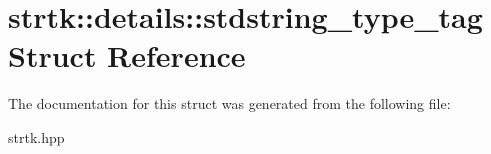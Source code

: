 \hypertarget{structstrtk_1_1details_1_1stdstring__type__tag}{\section{strtk\-:\-:details\-:\-:stdstring\-\_\-type\-\_\-tag Struct Reference}
\label{structstrtk_1_1details_1_1stdstring__type__tag}
}


The documentation for this struct was generated from the following file\-:\begin{DoxyCompactItemize}
\item 
strtk.\-hpp\end{DoxyCompactItemize}
